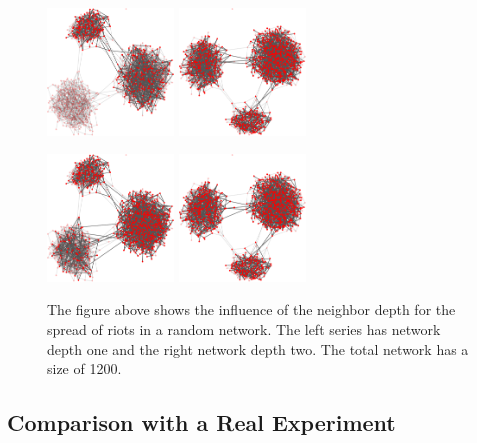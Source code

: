 \begin{figure}
\includegraphics[width=0.3\textwidth]{randomgraphnbrdepth1/network750-crop.pdf}
\hskip2cm
\includegraphics[width=0.3\textwidth]{randomgraphnbrdepth2/network750-crop.pdf}

\includegraphics[width=0.3\textwidth]{randomgraphnbrdepth1/network1000-crop.pdf}
\hskip2cm
\includegraphics[width=0.3\textwidth]{randomgraphnbrdepth2/network1000-crop.pdf}

\caption{The figure above shows the influence of the neighbor depth for the spread of riots in a random network. The left series has network depth one and the right network depth two. The total network has a size of 1200.}
\label{influenceNBRdepthRANDOM}
\end{figure}

\subsection{Comparison with a Real Experiment}
\label{sec:comparisontoreal}

